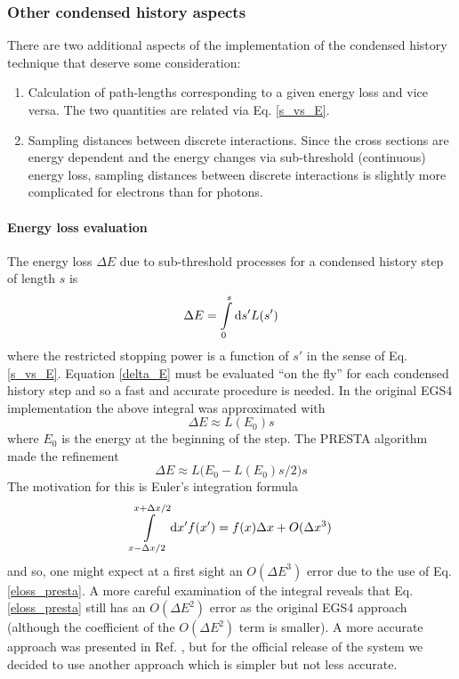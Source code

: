 \subsubsection{Other condensed history aspects}
\label{ch_others}
\setcounter{equation}{0}

There are two additional aspects of the implementation 
of the condensed history technique that deserve some 
consideration: 
\begin{enumerate}
\item
Calculation of path-lengths corresponding to a given 
energy loss and vice versa. The two quantities are 
related via Eq. \eqref{s_vs_E}. 
\item
Sampling distances between discrete interactions. 
Since the cross sections are energy dependent and 
the energy changes via sub-threshold (continuous) energy loss, 
sampling distances between discrete interactions is slightly 
more complicated for electrons than for photons.
\end{enumerate} 

\paragraph{Energy loss evaluation} \hfill
{}

The energy loss $\Delta E$ due 
to sub-threshold processes for 
a condensed history step of length $s$ is 
\begin{equation}
\label{delta_E}
\Delta E = \int\limits_0^s {\rm d}s' L(s')
\end{equation}
where the restricted stopping power is a function of $s'$ 
in the sense of Eq. \eqref{s_vs_E}. 
Equation \eqref{delta_E} must be evaluated ``on the fly'' for 
each condensed history step and so a fast and accurate 
procedure is needed. 
In the original 
EGS4 implementation the above integral was approximated with 
\begin{equation}
\Delta E \approx L(E_0) s 
\end{equation}
where $E_0$ is the energy at the beginning of the step. 
The PRESTA algorithm made the refinement 
\begin{equation}
\label{eloss_presta}
\Delta E \approx L\Big(E_0 - L(E_0) s/2\Big) s
\end{equation}
The motivation for this is Euler's integration formula
\begin{equation}
\int\limits_{x - \Delta x/2}^{x + \Delta x/2} {\rm d}x' f(x') 
= f(x) \Delta x + O(\Delta x^3)
\end{equation}
and so, one might expect at a first sight an $O(\Delta E^3)$ error due to 
the use of Eq. \eqref{eloss_presta}. A more careful examination 
of the integral reveals that Eq. \eqref{eloss_presta} still has 
an $O(\Delta E^2)$ error as the original EGS4 approach (although 
the coefficient of the $O(\Delta E^2)$ term is smaller).  
A more accurate approach was 
presented in Ref. \cite{Ka99a}, but for the official release of the 
system we decided to use another approach which is simpler 
but not less accurate. 

